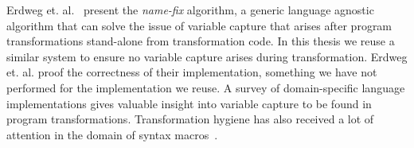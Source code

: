 Erdweg et. al.~\cite{Erdweg2014} present the \textit{name-fix} algorithm, a generic language agnostic algorithm that can solve the issue of variable capture that arises after program transformations stand-alone from transformation code. In this thesis we reuse a similar system to ensure no variable capture arises during transformation. Erdweg et. al. proof the correctness of their implementation, something we have not performed for the implementation we reuse. A survey of domain-specific language implementations gives valuable insight into variable capture to be found in program transformations. Transformation hygiene has also received a lot of attention in the domain of syntax macros~\cite{Kohlbecker1986,Herman2010a,Disney2014}. 
